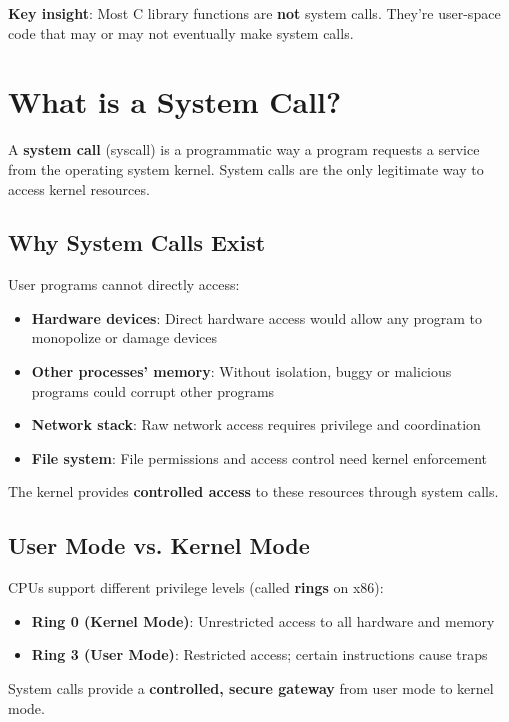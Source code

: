 \textbf{Key insight}: Most C library functions are \textbf{not} system calls. They're user-space code that may or may not eventually make system calls.

\section{What is a System Call?}

A \textbf{system call} (syscall) is a programmatic way a program requests a service from the operating system kernel. System calls are the only legitimate way to access kernel resources.

\subsection{Why System Calls Exist}

User programs cannot directly access:
\begin{itemize}
    \item \textbf{Hardware devices}: Direct hardware access would allow any program to monopolize or damage devices
    \item \textbf{Other processes' memory}: Without isolation, buggy or malicious programs could corrupt other programs
    \item \textbf{Network stack}: Raw network access requires privilege and coordination
    \item \textbf{File system}: File permissions and access control need kernel enforcement
\end{itemize}

The kernel provides \textbf{controlled access} to these resources through system calls.

\subsection{User Mode vs. Kernel Mode}

CPUs support different privilege levels (called \textbf{rings} on x86):
\begin{itemize}
    \item \textbf{Ring 0 (Kernel Mode)}: Unrestricted access to all hardware and memory
    \item \textbf{Ring 3 (User Mode)}: Restricted access; certain instructions cause traps
\end{itemize}

System calls provide a \textbf{controlled, secure gateway} from user mode to kernel mode.

